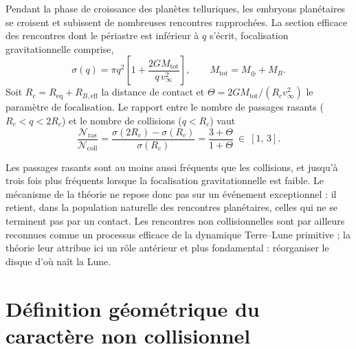 \documentclass[11pt,a4paper,openany]{report}
\newcommand{\Mt}{M_{\oplus}}
\newcommand{\Req}{R_{\mathrm{eq}}}
\newcommand{\Mtot}{M_{\mathrm{tot}}}
\begin{document}
Pendant la phase de croissance des planètes telluriques, les embryons planétaires se croisent
et subissent de nombreuses rencontres rapprochées. La section efficace des rencontres dont le
périastre est inférieur à $q$ s'écrit, focalisation gravitationnelle comprise,
\begin{equation}
\sigma(q)=\pi q^2\left[1+\frac{2G\Mtot}{q\,v_\infty^2}\right],
\qquad \Mtot=\Mt+M_B.
\label{eq:sigma}
\end{equation}
Soit $R_c=\Req+R_{B,\mathrm{eff}}$ la distance de contact et $\Theta=2G\Mtot/(R_c v_\infty^2)$ le
paramètre de focalisation. Le rapport entre le nombre de passages rasants
($R_c<q<2R_c$) et le nombre de collisions ($q<R_c$) vaut
\begin{equation}
\frac{\mathcal{N}_{\mathrm{ras}}}{\mathcal{N}_{\mathrm{coll}}}
=\frac{\sigma(2R_c)-\sigma(R_c)}{\sigma(R_c)}
=\frac{3+\Theta}{1+\Theta}\ \in\ [1,\,3].
\label{eq:frequence}
\end{equation}

\begin{apport}
Les passages rasants sont au moins aussi fréquents que les collisions, et jusqu'à trois fois
plus fréquents lorsque la focalisation gravitationnelle est faible. Le mécanisme de la théorie
ne repose donc pas sur un événement exceptionnel : il retient, dans la population naturelle des
rencontres planétaires, celles qui ne se terminent pas par un contact. Les rencontres non
collisionnelles sont par ailleurs reconnues comme un processus efficace de la dynamique
Terre--Lune primitive \cite{PahlevanMorbidelli2015} ; la théorie leur attribue ici un rôle
antérieur et plus fondamental : réorganiser le disque d'où naît la Lune.
\end{apport}

\section{Définition géométrique du caractère non collisionnel}
\end{document}
